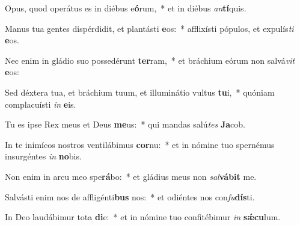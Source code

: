 \item Opus, quod operátus es in diébus e\textbf{ó}rum,~* et in diébus \textit{an}\textbf{tí}quis.
\item Manus tua gentes dispérdidit, et plantásti \textbf{e}os:~* afflixísti pópulos, et expulís\textit{ti} \textbf{e}os.
\item Nec enim in gládio suo possedérunt \textbf{ter}ram,~* et bráchium eórum non salvá\textit{vit} \textbf{e}os:
\item Sed déxtera tua, et bráchium tuum, et illuminátio vultus \textbf{tu}i,~* quóniam complacuísti \textit{in} \textbf{e}is.
\item Tu es ipse Rex meus et Deus \textbf{me}us:~* qui mandas salú\textit{tes} \textbf{Ja}cob.
\item In te inimícos nostros ventilábimus \textbf{cor}nu:~* et in nómine tuo spernémus insurgéntes \textit{in} \textbf{no}bis.
\item Non enim in arcu meo spe\textbf{rá}bo:~* et gládius meus non \textit{sal}\textbf{vá}\textbf{bit} me.
\item Salvásti enim nos de affligénti\textbf{bus} nos:~* et odiéntes nos con\textit{fu}\textbf{dís}ti.
\item In Deo laudábimur tota \textbf{di}e:~* et in nómine tuo confitébimur \textit{in} \textbf{sǽ}\textbf{cu}lum.
